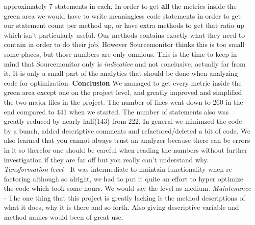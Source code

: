 \documentclass{article}
\begin{document}
approximately 7 statements in each. 
In order to get \textbf{all} the metrics inside the green area we would have to
write meaningless code statements in order to get our statement count per method up,
or have extra methods to get that ratio up which isn't particularly useful. Our
methods contains exactly what they need to contain in order to do their job. However Sourcemonitor thinks this is too small some places, but those numbers are only omnious. 
This is the time to keep in mind that Sourcemonitor only is \textit{indicative}
and not conclusive, actually far from it. It is only a small part of the analytics
that should be done when analyzing code for optimization. \vspace{0.3cm} \newline
\vspace{0.1cm}
\textbf{Conclusion}
\newline
We managed to get every metric inside the green area except one on the project level, and greatly improved and simplified the two major files in the project. The number of lines went down to 260 in the end compared to 441 when we started. The number of statements also was greatly reduced by nearly half(143) from 222. In general we minimzed the code by a bunch, added descriptive comments and refactored/deleted a bit of code. We also learned that you cannot always trust an analyzer because there can be errors in it so therefor one should be careful when reading the numbers without further investigation if they are far off but you really can't understand why.
\textit{Tansformation level} - It was intermediate to maintain functionality when re-factoring although so alright, we had to put it quite an effort to hyper optimize the code which took some hours. We would say the level as medium. \textit{Maintenance} - The one thing that this project is greatly lacking is the method descriptions of what it does, why it is there and so forth. Also giving descriptive variable and method names would been of great use. 

\end{document}
